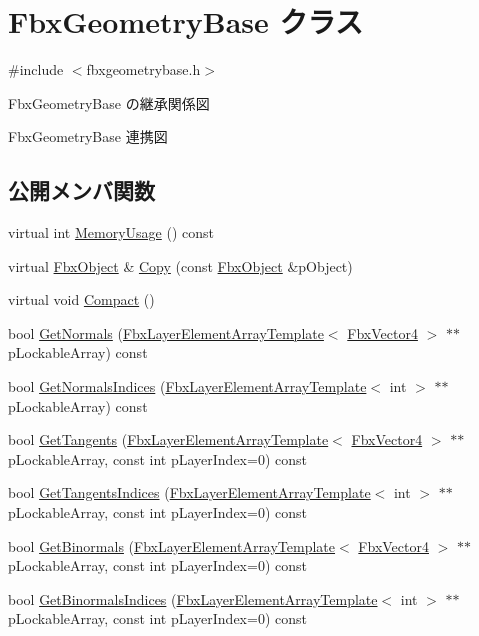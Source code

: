 \hypertarget{class_fbx_geometry_base}{}\section{Fbx\+Geometry\+Base クラス}
\label{class_fbx_geometry_base}


{\ttfamily \#include $<$fbxgeometrybase.\+h$>$}



Fbx\+Geometry\+Base の継承関係図


Fbx\+Geometry\+Base 連携図
\subsection*{公開メンバ関数}
\begin{DoxyCompactItemize}
\item 
virtual int \hyperlink{class_fbx_geometry_base_a858cccba0c319e1ee9160c0d7209bacf}{Memory\+Usage} () const
\item 
virtual \hyperlink{class_fbx_object}{Fbx\+Object} \& \hyperlink{class_fbx_geometry_base_a2c3754831338327259c35caebbf379d3}{Copy} (const \hyperlink{class_fbx_object}{Fbx\+Object} \&p\+Object)
\item 
virtual void \hyperlink{class_fbx_geometry_base_a66146155ecad4e6f6f2e8cf52e0340f6}{Compact} ()
\item 
bool \hyperlink{class_fbx_geometry_base_ad30d8655b9606f653e9467bb07c8b1f3}{Get\+Normals} (\hyperlink{class_fbx_layer_element_array_template}{Fbx\+Layer\+Element\+Array\+Template}$<$ \hyperlink{class_fbx_vector4}{Fbx\+Vector4} $>$ $\ast$$\ast$p\+Lockable\+Array) const
\item 
bool \hyperlink{class_fbx_geometry_base_ace44c4c25817ccabcf32e4c5b3b32936}{Get\+Normals\+Indices} (\hyperlink{class_fbx_layer_element_array_template}{Fbx\+Layer\+Element\+Array\+Template}$<$ int $>$ $\ast$$\ast$p\+Lockable\+Array) const
\item 
bool \hyperlink{class_fbx_geometry_base_aa8b22c9380e8c8be64855a6409136210}{Get\+Tangents} (\hyperlink{class_fbx_layer_element_array_template}{Fbx\+Layer\+Element\+Array\+Template}$<$ \hyperlink{class_fbx_vector4}{Fbx\+Vector4} $>$ $\ast$$\ast$p\+Lockable\+Array, const int p\+Layer\+Index=0) const
\item 
bool \hyperlink{class_fbx_geometry_base_aa1da929bb1905386e98d8e1caff3556e}{Get\+Tangents\+Indices} (\hyperlink{class_fbx_layer_element_array_template}{Fbx\+Layer\+Element\+Array\+Template}$<$ int $>$ $\ast$$\ast$p\+Lockable\+Array, const int p\+Layer\+Index=0) const
\item 
bool \hyperlink{class_fbx_geometry_base_a935f60845a0b9a5d484a8540f52ee07d}{Get\+Binormals} (\hyperlink{class_fbx_layer_element_array_template}{Fbx\+Layer\+Element\+Array\+Template}$<$ \hyperlink{class_fbx_vector4}{Fbx\+Vector4} $>$ $\ast$$\ast$p\+Lockable\+Array, const int p\+Layer\+Index=0) const
\item 
bool \hyperlink{class_fbx_geometry_base_af3b46f6aaa0e79c91ad7a89977413f57}{Get\+Binormals\+Indices} (\hyperlink{class_fbx_layer_element_array_template}{Fbx\+Layer\+Element\+Array\+Template}$<$ int $>$ $\ast$$\ast$p\+Lockable\+Array, const int p\+Layer\+Index=0) const
\end{DoxyCompactItemize}

